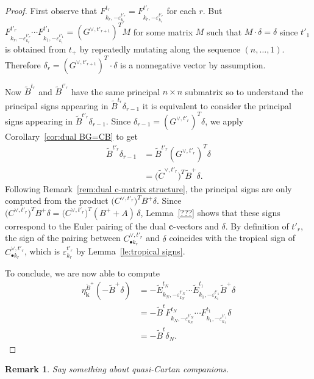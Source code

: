 \documentclass{amsart}
\newtheorem{remark}[theorem]{Remark}
\numberwithin{theorem}{section}
\newcommand{\bfc}{\boldsymbol{c}}
\newcommand{\bfk}{{\boldsymbol{k}}}
\begin{document}
  \begin{proof}
    First observe that $F^{t_r}_{k_r,-\varepsilon^{t'_r}_{k_r}}=F^{t'_r}_{k_r,-\varepsilon^{t'_r}_{k_r}}$ for each $r$.
    But $F^{t'_r}_{k_r,-\varepsilon^{t'_r}_{k_r}} \cdots F^{t'_1}_{k_1,-\varepsilon^{t'_1}_{k_1}}=(G^{\vee,t'_{r+1}})^T M$ for some matrix $M$ such that $M\cdot \delta=\delta$ since $t'_1$ is obtained from $t_+$ by repeatedly mutating along the sequence $(n,\ldots,1)$.
    Therefore $\delta_r = (G^{\vee,t'_{r+1}})^T \cdot \delta$ is a nonnegative vector by assumption.

    Now $\widetilde B^{t_r}$ and $\widetilde B^{t'_r}$ have the same principal $n\times n$ submatrix so to understand the principal signs appearing in $\widetilde B^{t_r} \delta_{r-1}$ it is equivalent to consider the principal signs appearing in $\widetilde B^{t'_r} \delta_{r-1}$.
    Since $\delta_{r-1} = (G^{\vee,t'_r})^T \delta$, we apply Corollary~\ref{cor:dual BG=CB} to get
    \begin{align*}
      \widetilde B^{t'_r} \delta_{r-1} 
      &= \widetilde B^{t'_r} (G^{\vee,t'_r})^T \delta\\
      &= \big(\widetilde C^{\vee,t'_r}\big)^T \widetilde B^+ \delta.
    \end{align*}
    Following Remark~\ref{rem:dual c-matrix structure}, the principal signs are only computed from the product $\big(C^{\vee,t'_r}\big)^T B^+ \delta$.
    Since $\big(C^{\vee,t'_r}\big)^T B^+ \delta = \big(C^{\vee,t'_r}\big)^T (B^+ + A) \, \delta$, Lemma~\ref{???} shows that these signs correspond to the Euler pairing of the dual $\bfc$-vectors and $\delta$.
    By definition of $t'_r$, the sign of the pairing between $C^{\vee,t'_r}_{\bullet k_r}$ and $\delta$ coincides with the tropical sign of $C^{\vee,t'_r}_{\bullet k_r}$, which is $\varepsilon^{t'_r}_{k_r}$ by Lemma~\ref{le:tropical signs}.

    To conclude, we are now able to compute 
    \begin{align*}
      \eta_\bfk^{\widetilde B^+}\left(-\widetilde B^+\delta\right)
      &= - \widetilde E^{t_N}_{k_N,-\varepsilon^{t'_N}_{k_N}} \cdots \widetilde E^{t_1}_{k_1,-\varepsilon^{t'_1}_{k_1}} \widetilde B^+ \delta\\
      &= - \widetilde B^t F^{t_N}_{k_N,-\varepsilon^{t'_N}_{k_N}} \cdots F^{t_1}_{k_1,-\varepsilon^{t'_1}_{k_1}} \delta\\
      &= - \widetilde B^t \delta_N.
    \end{align*}
  \end{proof}
  \begin{remark}
    Say something about quasi-Cartan companions.
  \end{remark}
\end{document}
